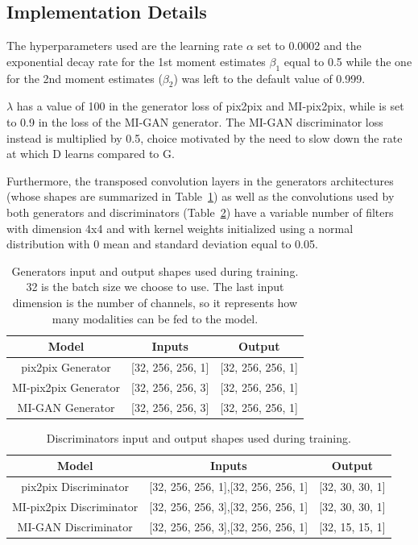 \subsection{Implementation Details}
\label{subsec:implementation_details}

The hyperparameters used are the learning rate $\alpha$ set to 0.0002 and the exponential decay rate for the 1st moment estimates $\beta_1$ equal to 0.5 while the one for the 2nd moment estimates ($\beta_2$) was left to the default value of 0.999.

$\lambda$ has a value of 100 in the generator loss of pix2pix and MI-pix2pix, while is set to 0.9 in the loss of the MI-GAN generator. 
The MI-GAN discriminator loss instead is multiplied by 0.5, choice motivated by the need to slow down the rate at which D learns compared to G.

\vspace{5mm} %
Furthermore, the transposed convolution layers in the generators architectures (whose shapes are summarized in Table~\ref{tab:resume_architectures_generators}) as well as the convolutions used by both generators and discriminators (Table~\ref{tab:resume_architectures_discriminators}) have a variable number of filters with dimension 4x4 and with kernel weights initialized using a normal distribution with 0 mean and standard deviation equal to 0.05.

\begin{table}[htbp!]
\centering
\begin{tabular}{ccc}
\toprule
Model & Inputs & Output\\
\midrule
pix2pix Generator & [32, 256, 256, 1] & [32, 256, 256, 1]\\
MI-pix2pix Generator & [32, 256, 256, 3] & [32, 256, 256, 1]\\
MI-GAN Generator & [32, 256, 256, 3] & [32, 256, 256, 1]\\
\bottomrule	
\end{tabular}
\caption[Generators input and output shapes used during training]{Generators input and output shapes used during training. 32 is the batch size we choose to use. The last input dimension is the number of channels, so it represents how many modalities can be fed to the model.}
\label{tab:resume_architectures_generators}
\end{table}

\begin{table}[H]
\centering
\begin{tabular}{ccc}
\toprule
Model & Inputs & Output\\
\midrule
pix2pix Discriminator & [32, 256, 256, 1],[32, 256, 256, 1] & [32, 30, 30, 1]\\
MI-pix2pix Discriminator & [32, 256, 256, 3],[32, 256, 256, 1] & [32, 30, 30, 1]\\
MI-GAN Discriminator & [32, 256, 256, 3],[32, 256, 256, 1] & [32, 15, 15, 1]\\
\bottomrule	
\end{tabular}
\caption[Discriminators input and output shapes used during training]{Discriminators input and output shapes used during training.}
\label{tab:resume_architectures_discriminators}
\end{table}

